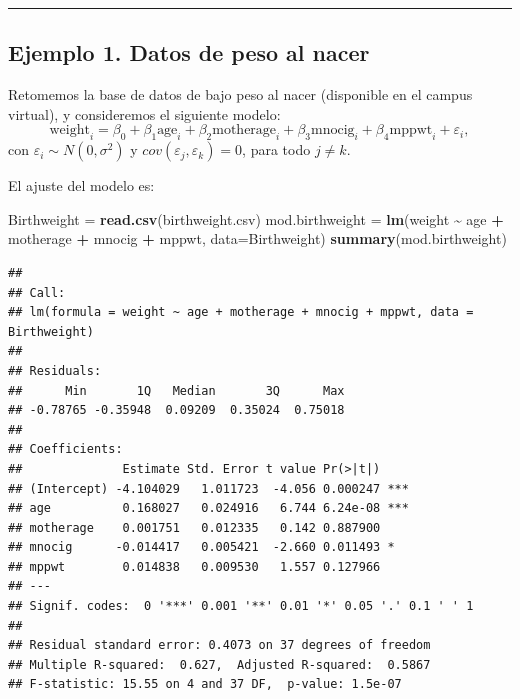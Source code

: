\documentclass[
]{article}
\newenvironment{Shaded}{\begin{snugshade}}{\end{snugshade}}
\newcommand{\AttributeTok}[1]{\textcolor[rgb]{0.13,0.29,0.53}{#1}}
\newcommand{\FunctionTok}[1]{\textcolor[rgb]{0.13,0.29,0.53}{\textbf{#1}}}
\newcommand{\NormalTok}[1]{#1}
\newcommand{\OtherTok}[1]{\textcolor[rgb]{0.56,0.35,0.01}{#1}}
\newcommand{\SpecialCharTok}[1]{\textcolor[rgb]{0.81,0.36,0.00}{\textbf{#1}}}
\newcommand{\StringTok}[1]{\textcolor[rgb]{0.31,0.60,0.02}{#1}}
\begin{document}
\rule{\textwidth}{0.4pt}

\hypertarget{ejemplo-1.-datos-de-peso-al-nacer}{%
\subsection*{Ejemplo 1. Datos de peso al nacer}\label{ejemplo-1.-datos-de-peso-al-nacer}}

Retomemos la base de datos de bajo peso al nacer (disponible en el campus virtual), y consideremos el siguiente modelo:
\[
\mbox{weight}_{i} = \beta_{0} + \beta_{1}\mbox{age}_{i} + \beta_{2}\mbox{motherage}_{i} + \beta_{3}\mbox{mnocig}_{i} + \beta_{4}\mbox{mppwt}_{i} + \varepsilon_{i},
\]
con \(\varepsilon_{i} \sim N\left(0,\sigma^{2} \right)\) y \(cov(\varepsilon_{j},\varepsilon_{k})=0\), para todo \(j \neq k\).

El ajuste del modelo es:

\begin{Shaded}
\begin{Highlighting}[]
\NormalTok{Birthweight }\OtherTok{=} \FunctionTok{read.csv}\NormalTok{(}\StringTok{\textquotesingle{}birthweight.csv\textquotesingle{}}\NormalTok{)}
\NormalTok{mod.birthweight }\OtherTok{=} \FunctionTok{lm}\NormalTok{(weight }\SpecialCharTok{\textasciitilde{}}\NormalTok{ age }\SpecialCharTok{+}\NormalTok{ motherage }\SpecialCharTok{+}\NormalTok{ mnocig }\SpecialCharTok{+}\NormalTok{ mppwt, }\AttributeTok{data=}\NormalTok{Birthweight)}
\FunctionTok{summary}\NormalTok{(mod.birthweight)}
\end{Highlighting}
\end{Shaded}

\begin{verbatim}
## 
## Call:
## lm(formula = weight ~ age + motherage + mnocig + mppwt, data = Birthweight)
## 
## Residuals:
##      Min       1Q   Median       3Q      Max 
## -0.78765 -0.35948  0.09209  0.35024  0.75018 
## 
## Coefficients:
##              Estimate Std. Error t value Pr(>|t|)    
## (Intercept) -4.104029   1.011723  -4.056 0.000247 ***
## age          0.168027   0.024916   6.744 6.24e-08 ***
## motherage    0.001751   0.012335   0.142 0.887900    
## mnocig      -0.014417   0.005421  -2.660 0.011493 *  
## mppwt        0.014838   0.009530   1.557 0.127966    
## ---
## Signif. codes:  0 '***' 0.001 '**' 0.01 '*' 0.05 '.' 0.1 ' ' 1
## 
## Residual standard error: 0.4073 on 37 degrees of freedom
## Multiple R-squared:  0.627,  Adjusted R-squared:  0.5867 
## F-statistic: 15.55 on 4 and 37 DF,  p-value: 1.5e-07
\end{verbatim}
\end{document}
